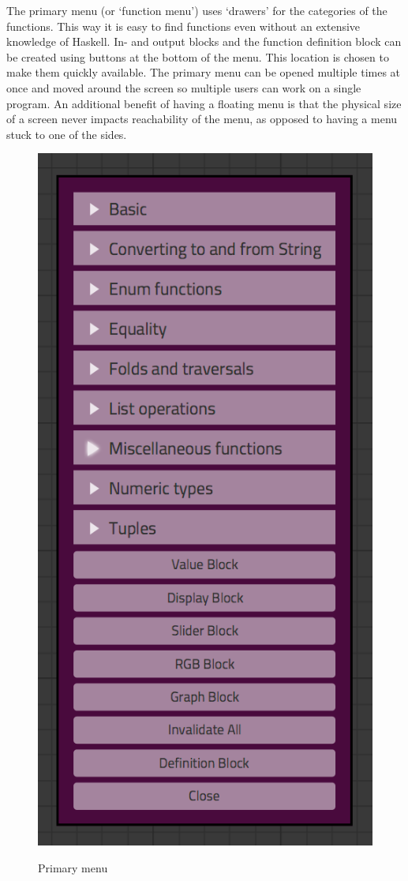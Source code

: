 The primary menu (or `function menu') uses `drawers' for the categories of the functions.  
This way it is easy to find functions even without an extensive knowledge of Haskell.
In- and output blocks and the function definition block can be created using buttons at the bottom of the menu.
This location is chosen to make them quickly available.
The primary menu can be opened multiple times at once and moved around the screen so multiple users can work on a single program. An additional benefit of having a floating menu is that the physical size of a screen never impacts reachability of the menu, as opposed to having a menu stuck to one of the sides.

\begin{figure}[p]
	\centering
	\includegraphics[scale=0.5]{Images/menu}
	\label{fig:ui-menu}
	\caption{Primary menu}
\end{figure}

